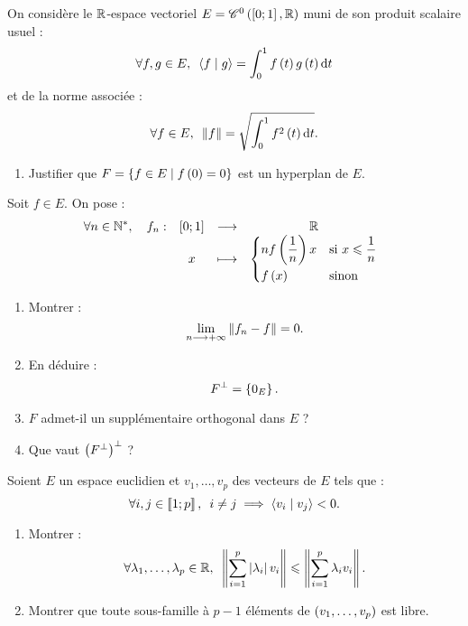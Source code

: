 \begin{corr}
\end{corr}

\begin{exo}
On considère le \(\mathbb{R}\)-espace vectoriel \(E=\mathscr{C}^{0}\left(\left[0;1\right],\mathbb{R}\right)\) muni de son produit scalaire usuel : \[\quantifs{\forall f,g\in E}\ps{f}{g}=\int_0^1f\paren{t}g\paren{t}\odif{t}\] et de la norme associée : \[\quantifs{\forall f\in E}\norme{f}=\sqrt{\int_0^1f^2\paren{t}\odif{t}}.\]

\begin{enumerate}[series=ssevsanssupportho]
\item Justifier que \(F=\left\lbrace f\in E\;\middle|\; f\left(0\right)=0\right\rbrace\) est un hyperplan de \(E\).
\end{enumerate}

Soit \(f\in E\). On pose : \[\quantifs{\forall n\in\Ns}\fonction{f_n}{\intervii{0}{1}}{\R}{x}{\begin{dcases}
nf\paren{\dfrac{1}{n}}x &\text{si }x\leq\dfrac{1}{n} \\
f\paren{x} &\text{sinon}
\end{dcases}}\]

\begin{enumerate}[resume=ssevsanssupportho]
\item Montrer : \[\lim_{n\longrightarrow+\infty}\left\|f_n-f\right\|=0.\]

\item En déduire : \[F^{\perp}=\left\lbrace0_E\right\rbrace.\]

\item \(F\) admet-il un supplémentaire orthogonal dans \(E\) ? \\

\item Que vaut \(\left(F^{\perp}\right)^{\perp}\) ?
\end{enumerate}
\end{exo}

\begin{corr}
\end{corr}

\begin{exo}[Exercice 15]
Soient \(E\) un espace euclidien et \(v_1,\dots,v_p\) des vecteurs de \(E\) tels que : \[\quantifs{\forall i,j\in\interventierii{1}{p}}i\not=j\imp\ps{v_i}{v_j}<0.\]

\begin{enumerate}
\item Montrer : \[\quantifs{\forall\lambda_1,\dots,\lambda_p\in\R}\norme{\sum_{i=1}^p\abs{\lambda_i}v_i}\leq\norme{\sum_{i=1}^p\lambda_iv_i}.\]

\item Montrer que toute sous-famille à \(p-1\) éléments de \(\left(v_1,\dots,v_p\right)\) est libre.
\end{enumerate}
\end{exo}

